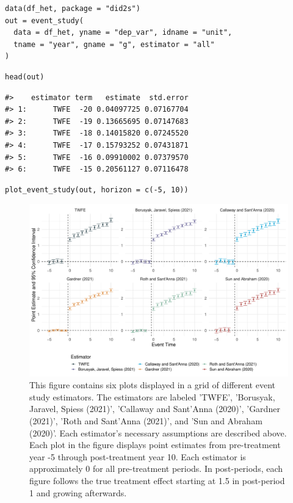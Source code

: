 \begin{verbatim}
data(df_het, package = "did2s")
out = event_study(
  data = df_het, yname = "dep_var", idname = "unit",
  tname = "year", gname = "g", estimator = "all"
)
\end{verbatim}

\begin{verbatim}
head(out)
\end{verbatim}

\begin{verbatim}
#>    estimator term   estimate  std.error
#> 1:      TWFE  -20 0.04097725 0.07167704
#> 2:      TWFE  -19 0.13665695 0.07147683
#> 3:      TWFE  -18 0.14015820 0.07245520
#> 4:      TWFE  -17 0.15793252 0.07431871
#> 5:      TWFE  -16 0.09910002 0.07379570
#> 6:      TWFE  -15 0.20561127 0.07116478
\end{verbatim}

\begin{verbatim}
plot_event_study(out, horizon = c(-5, 10))
\end{verbatim}

\begin{figure}
\includegraphics[width=1\linewidth]{did2s_files/figure-latex/es-alternatives-1} \caption{This figure contains six plots displayed in a grid of different event study estimators. The estimators are labeled 'TWFE', 'Borusyak, Jaravel, Spiess (2021)', 'Callaway and Sant'Anna (2020)', 'Gardner (2021)', 'Roth and Sant'Anna (2021)', and 'Sun and Abraham (2020)'. Each estimator's necessary assumptions are described above. Each plot in the figure displays point estimates from pre-treatment year -5 through post-treatment year 10. Each estimator is approximately 0 for all pre-treatment periods. In post-periods, each figure follows the true treatment effect starting at 1.5 in post-period 1 and growing afterwards.}\label{fig:es-alternatives}
\end{figure}


